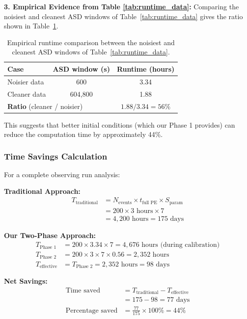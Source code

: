 \documentclass[12pt]{article}
\begin{document}
\textbf{3. Empirical Evidence from Table \ref{tab:runtime_data}:}
Comparing the noisiest and cleanest ASD windows of Table~\ref{tab:runtime_data} gives the ratio shown in Table~\ref{tab:empirical_ratio}.

\begin{table}[ht]
\centering
\caption{Empirical runtime comparison between the noisiest and cleanest ASD windows of Table~\ref{tab:runtime_data}.}
\label{tab:empirical_ratio}
\begin{tabular}{|l|c|c|}
\hline
\textbf{Case} & \textbf{ASD window (s)} & \textbf{Runtime (hours)} \\
\hline
Noisier data & 600 & 3.34 \\
Cleaner data & 604,800 & 1.88 \\
\hline
\multicolumn{2}{|l|}{\textbf{Ratio} (cleaner / noisier)} & $1.88/3.34 = 56\%$ \\
\hline
\end{tabular}
\end{table}

This suggests that better initial conditions (which our Phase 1 provides) can reduce the computation time by approximately 44\%.

\subsubsection{Time Savings Calculation}

For a complete observing run analysis:

\textbf{Traditional Approach:}
\begin{align}
T_{\text{traditional}} &= N_{\text{events}} \times t_{\text{full PE}} \times S_{\text{param}} \\
&= 200 \times 3 \text{ hours} \times 7 \\
&= 4,200 \text{ hours} = 175 \text{ days}
\end{align}

\textbf{Our Two-Phase Approach:}
\begin{align}
T_{\text{Phase 1}} &= 200 \times 3.34 \times 7 = 4,676 \text{ hours (during calibration)} \\
T_{\text{Phase 2}} &= 200 \times 3 \times 7 \times 0.56 = 2,352 \text{ hours} \\
T_{\text{effective}} &= T_{\text{Phase 2}} = 2,352 \text{ hours} = 98 \text{ days}
\end{align}

\textbf{Net Savings:}
\begin{align}
\text{Time saved} &= T_{\text{traditional}} - T_{\text{effective}} \\
&= 175 - 98 = 77 \text{ days} \\
\text{Percentage saved} &= \frac{77}{175} \times 100\% = 44\%
\end{align}
\end{document}
